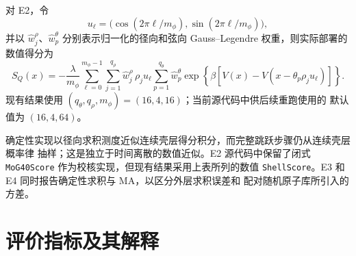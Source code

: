 \documentclass[11pt,a4paper]{article}
\begin{document}
对 E2，令
\[
 u_\ell=\bigl(\cos(2\pi\ell/m_\phi),\sin(2\pi\ell/m_\phi)\bigr),
\]
并以 $\widehat w_j^\rho$、$\widehat w_p^\theta$ 分别表示归一化的径向和弦向
Gauss--Legendre 权重，则实际部署的数值得分为
\begin{equation}
 S_Q(x)=-\frac{\lambda}{m_\phi}
 \sum_{\ell=0}^{m_\phi-1}\sum_{j=1}^{q_\rho}
 \widehat w_j^\rho\,\rho_j u_\ell
 \sum_{p=1}^{q_\theta}\widehat w_p^\theta
 \exp\!\left\{\beta\left[
 V(x)-V(x-\theta_p\rho_j u_\ell)
 \right]\right\}.
 \label{eq:zh-e2-score}
\end{equation}
现有结果使用 $(q_\theta,q_\rho,m_\phi)=(16,4,16)$；当前源代码中供后续重跑使用的
默认值为 $(16,4,64)$。

确定性实现以径向求积测度近似连续壳层得分积分，而完整跳跃步骤仍从连续壳层概率律
抽样；这是独立于时间离散的数值近似。E2 源代码中保留了闭式
\texttt{MoG40Score} 作为校核实现，但现有结果采用上表所列的数值
\texttt{ShellScore}。E3 和 E4 同时报告确定性求积与 MA，以区分外层求积误差和
配对随机原子库所引入的方差。

\section{评价指标及其解释}
\end{document}
